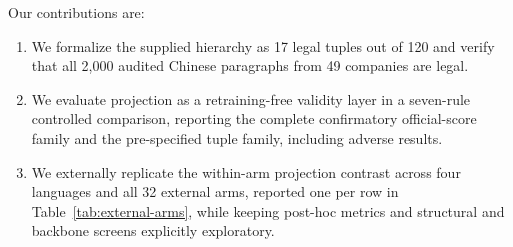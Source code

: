 Our contributions are:
\begin{enumerate}
  \item We formalize the supplied hierarchy as 17 legal tuples out of 120 and
  verify that all 2,000 audited Chinese paragraphs from 49 companies are legal.
  \item We evaluate projection as a retraining-free validity layer in a
  seven-rule controlled comparison, reporting the complete confirmatory
  official-score family and the pre-specified tuple family, including adverse
  results.
  \item We externally replicate the within-arm projection contrast across four
  languages and all 32 external arms, reported one per row in
  Table~\ref{tab:external-arms}, while keeping post-hoc metrics and
  structural and backbone screens explicitly exploratory.
\end{enumerate}
